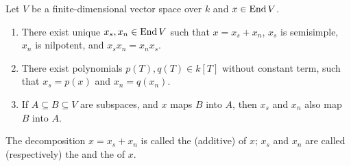 \begin{theorem}
    Let $V$ be a finite-dimensional vector space over $k$ and $x\in\operatorname{End} V$. 
    \begin{enumerate}[label=(\alph*)]
        \item There exist unique $x_s, x_n\in\operatorname{End} V$ such that $x = x_s + x_n$, $x_s$ is semisimple, $x_n$ is nilpotent, and $x_sx_n = x_nx_s$.
        \item There exist polynomials $p(T), q(T)\in k[T]$ without constant term, such that $x_s = p(x)$ and $x_n = q(x_n)$.
        \item If $A\subseteq B\subseteq V$ are subspaces, and $x$ maps $B$ into $A$, then $x_s$ and $x_n$ also map $B$ into $A$.
    \end{enumerate}
    The decomposition $x = x_s + x_n$ is called the (additive)  of $x$; $x_s$ and $x_n$ are called (respectively) the  and the  of $x$.
\end{theorem}
